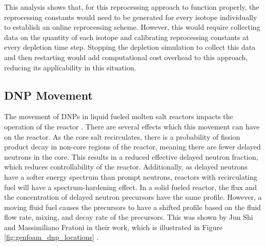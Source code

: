 This analysis shows that, for this reprocessing approach to function properly, the reprocessing constants would need to be generated for every isotope individually to establish an online reprocessing scheme. However, this would require collecting data on the quantity of each isotope and calibrating reprocessing constants at every depletion time step. Stopping the depletion simulation to collect this data and then restarting would add computational cost overhead to this approach, reducing its applicability in this situation.



\subsection{DNP Movement}

The movement of DNPs in liquid fueled molten salt reactors impacts the operation of the reactor \cite{wooten_review_2018, aufiero_calculating_2014}. %
There are several effects which this movement can have on the reactor. %
As the core salt recirculates, there is a probability of fission product decay in non-core regions of the reactor, meaning there are fewer delayed neutrons in the core. This results in a reduced effective delayed neutron fraction, which reduces controllability of the reactor. Additionally, as delayed neutrons have a softer energy spectrum than prompt neutrons, reactors with recirculating fuel will have a spectrum-hardening effect.
In a solid fueled reactor, the flux and the concentration of delayed neutron precursors have the same profile. However, a moving fluid fuel causes the precursors to have a shifted profile based on the fluid flow rate, mixing, and decay rate of the precursors. This was shown by Jun Shi and Massimiliano Fratoni in their work, which is illustrated in Figure \ref{fig:genfoam_dnp_locations} \cite{shi_gen-foam_2021}.

